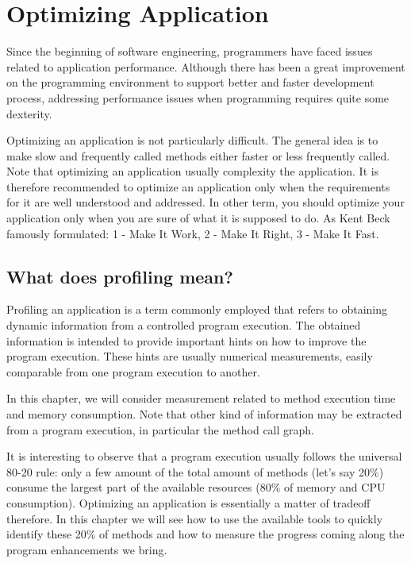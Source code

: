 \documentclass[a4paper,10pt,twoside]{book}
\begin{document}


\chapter{Optimizing Application}

Since the beginning of software engineering, programmers have faced issues related to application performance. Although there has been a great improvement on the programming environment to support better and faster development process, addressing performance issues when programming requires quite some dexterity.

Optimizing an application is not particularly difficult. The general idea is to make slow and frequently called methods either faster or less frequently called. Note that optimizing an application usually complexity the application. It is therefore recommended to optimize an application only when the requirements for it are well understood and addressed. In other term, you should optimize your application only when you are sure of what it is supposed to do. As Kent Beck famously formulated: 1 - Make It Work, 2 - Make It Right, 3 - Make It Fast.

\section{What does profiling mean?} 
Profiling an application is a term commonly employed that refers to obtaining dynamic information from a controlled program execution. The obtained information is intended to provide important hints on how to improve the program execution. These hints are usually numerical measurements, easily comparable from one program execution to another.

In this chapter, we will consider measurement related to method execution time and memory consumption. Note that other kind of information may be extracted from a program execution, in particular the method call graph.

It is interesting to observe that a program execution usually follows the universal 80-20 rule: only a few amount of the total amount of methods (let's say 20\%) consume the largest part of the available resources (80\% of memory and CPU consumption). Optimizing an application is essentially a matter of tradeoff therefore. In this chapter we will see how to use the available tools to quickly identify these 20\% of methods and how to measure the progress coming along the program enhancements we bring.
\end{document}
